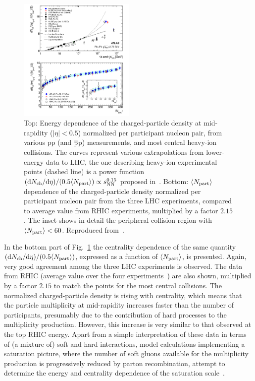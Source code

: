 \begin{figure}
\centering
\includegraphics[width=0.5\textwidth]{ksfigures/EnergCentMult.png}
\caption{Top: Energy dependence of the charged-particle density at mid-rapidity ($|\eta| < 0.5$) normalized per participant nucleon pair, from various pp (and $\overline{\rm p}$p) measurements, and most central heavy-ion collisions. The curves represent various extrapolations from lower-energy data to LHC, the one describing heavy-ion experimental points (dashed line) is a power function $({\rm d}N_{\rm ch}/{\rm d}\eta)/(0.5 \langle N_{\rm part} \rangle) \propto s_{\rm NN}^{0.15}$ proposed in~\cite{Aamodt:2010pb}. Bottom: $\langle N_{\rm part} \rangle$ dependence of the charged-particle density normalized per participant nucleon pair from the three LHC experiments, compared to average value from RHIC experiments, multiplied by a factor $2.15$. The inset shows in detail the peripheral-collision region with $\langle N_{\rm part} \rangle < 60$. Reproduced from~\cite{ATLAS:2011ag}.}
\label{figks:EnrgyMult}
\end{figure}

In the bottom part of Fig.~\ref{figks:EnrgyMult} the centrality dependence of the same quantity $({\rm d}N_{\rm ch}/{\rm d}\eta)/(0.5 \langle N_{\rm part} \rangle)$, expressed as a function of $\langle N_{\rm part} \rangle$, is presented. Again, very good agreement among the three LHC experiments is observed. The data from RHIC (average value over the four experiments~\cite{Adler:2004zn}) are also shown, multiplied by a factor $2.15$ to match the points for the most central collisions. The normalized charged-particle density is rising with centrality, which means that the particle multiplicity at mid-rapidity increases faster than the number of participants, presumably due to the contribution of hard processes to the multiplicity production. However, this increase is very similar to that observed at the top RHIC energy. Apart from a simple interpretation of these data in terms of (a mixture of) soft and hard interactions, model calculations implementing a saturation picture, where the number of soft gluons available for the multiplicity production is progressively reduced by parton recombination, attempt to determine the energy and centrality dependence of the saturation scale~\cite{Armesto:2004ud,Kharzeev:2004if,ALbacete:2010ad}.

